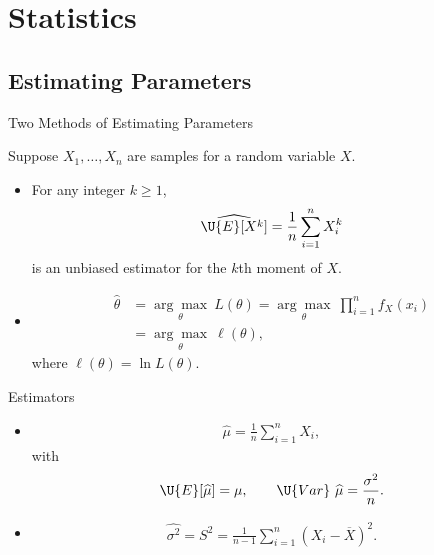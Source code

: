 \section{Statistics}

\subsection{Estimating Parameters}

\begin{frame}{Two Methods of Estimating Parameters}

Suppose $X_1, \ldots, X_n$ are samples for a random variable $X$.
\begin{itemize}
	\item {} For any integer $k\geq 1$,
	\begin{align*}
	\widehat{\U{E}[X^k]} = \frac{1}{n}\sum_{i=1}^n X_i^k
	\end{align*}
	is an unbiased estimator for the $k$th moment of $X$.
	\item {} 
	\begin{align*}
	\widehat{\theta} & = \underset{\theta}{\arg\max}\ L(\theta) = \underset{\theta}{\arg\max}\ \prod_{i=1}^n f_{X}(x_i) \\
	& = \underset{\theta}{\arg\max}\ \ell(\theta),
	\end{align*}
	where $\ell(\theta) = \ln L(\theta)$.
\end{itemize}

\end{frame}

\begin{frame}{Estimators}

\begin{itemize}
	\justifying
	\item {} 
	\begin{align*}
	\widehat{\mu} = \frac{1}{n}\sum_{i=1}^n X_i,
	\end{align*}
	with
	\begin{align*}
	\U{E}[\widehat{\mu}] = \mu, \qquad \U{Var}\ \widehat{\mu} = \frac{\sigma^2}{n}.
	\end{align*}
	\item {}
	\begin{align*}
	\widehat{\sigma^2} = S^2 = \frac{1}{n-1}\sum_{i=1}^n (X_i - \overline{X})^2.
	\end{align*}
\end{itemize}

\end{frame}

